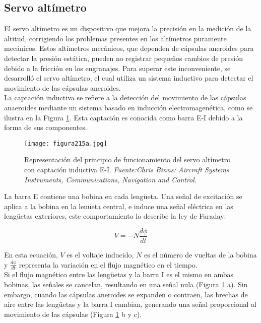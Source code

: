 \subsection{Servo altímetro}

El servo altímetro es un dispositivo que mejora la precisión en la medición de la altitud, corrigiendo los problemas presentes en los altímetros puramente mecánicos. Estos altímetros mecánicos, que dependen de cápsulas aneroides para detectar la presión estática, pueden no registrar pequeños cambios de presión debido a la fricción en los engranajes. Para superar este inconveniente, se desarrolló el  servo altímetro, el cual utiliza un sistema inductivo para detectar el movimiento de las cápsulas aneroides.\\

La captación inductiva se refiere a la detección del movimiento de las cápsulas anaeroides mediante un sistema basado en inducción electromagenética, como se ilustra en la Figura \ref{fig:yepaaa}. Esta captación es conocida como barra E-I debido a la forma de sus componentes.
\begin{figure}[H]
    \centering
    \texttt{[image: figura215a.jpg]}
    \caption{\centering Representación del principio de funcionamiento del servo altímetro con captación inductiva E-I.\textit{ Fuente:Chris Binns: Aircraft Systems Instruments, Communications, Navigation and Control.}}
    \label{fig:yepaaa}
\end{figure}

La barra E contiene una bobina en cada lengüeta. Una señal de excitación se aplica a la bobina en la lenüeta central, e induce una señal eléctrica en las lengüetas exteriores, este comportamiento lo describe la ley de Faraday:\\

\begin{definicion}
\begin{equation}
V = -N \frac{d \phi}{d t}
\end{equation}
\end{definicion}

En esta ecuación, \( V \) es el voltaje inducido, \( N \) es el número de vueltas de la bobina y \( \frac{d \phi}{d t} \) representa la variación en el flujo magnético en el tiempo.\\

Si el flujo magnético entre las lengüetas y la barra I es el mismo en ambas bobinas, las señales se cancelan, resultando en una señal nula (Figura \ref{fig:yepaaa} a). Sin embargo, cuando las cápsulas aneroides se expanden o contraen, las brechas de aire entre las lengüetas y la barra I cambian, generando una señal proporcional al movimiento de las cápsulas (Figura \ref{fig:yepaaa} b y c).\\

